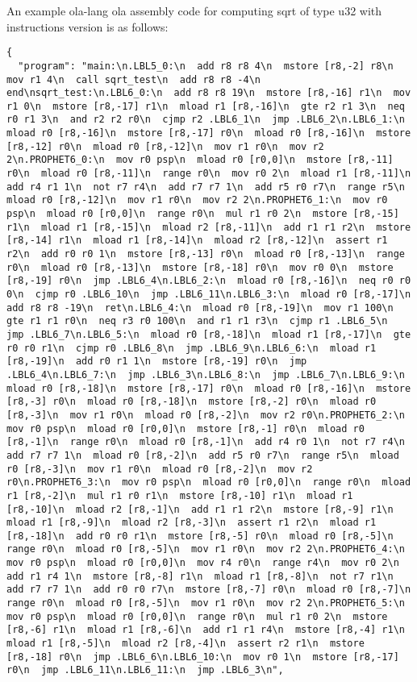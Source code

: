 An example ola-lang ola assembly code for computing sqrt of type u32 with instructions version is as follows:
\begin{lstlisting}[language={}]
{
  "program": "main:\n.LBL5_0:\n  add r8 r8 4\n  mstore [r8,-2] r8\n  mov r1 4\n  call sqrt_test\n  add r8 r8 -4\n  end\nsqrt_test:\n.LBL6_0:\n  add r8 r8 19\n  mstore [r8,-16] r1\n  mov r1 0\n  mstore [r8,-17] r1\n  mload r1 [r8,-16]\n  gte r2 r1 3\n  neq r0 r1 3\n  and r2 r2 r0\n  cjmp r2 .LBL6_1\n  jmp .LBL6_2\n.LBL6_1:\n  mload r0 [r8,-16]\n  mstore [r8,-17] r0\n  mload r0 [r8,-16]\n  mstore [r8,-12] r0\n  mload r0 [r8,-12]\n  mov r1 r0\n  mov r2 2\n.PROPHET6_0:\n  mov r0 psp\n  mload r0 [r0,0]\n  mstore [r8,-11] r0\n  mload r0 [r8,-11]\n  range r0\n  mov r0 2\n  mload r1 [r8,-11]\n  add r4 r1 1\n  not r7 r4\n  add r7 r7 1\n  add r5 r0 r7\n  range r5\n  mload r0 [r8,-12]\n  mov r1 r0\n  mov r2 2\n.PROPHET6_1:\n  mov r0 psp\n  mload r0 [r0,0]\n  range r0\n  mul r1 r0 2\n  mstore [r8,-15] r1\n  mload r1 [r8,-15]\n  mload r2 [r8,-11]\n  add r1 r1 r2\n  mstore [r8,-14] r1\n  mload r1 [r8,-14]\n  mload r2 [r8,-12]\n  assert r1 r2\n  add r0 r0 1\n  mstore [r8,-13] r0\n  mload r0 [r8,-13]\n  range r0\n  mload r0 [r8,-13]\n  mstore [r8,-18] r0\n  mov r0 0\n  mstore [r8,-19] r0\n  jmp .LBL6_4\n.LBL6_2:\n  mload r0 [r8,-16]\n  neq r0 r0 0\n  cjmp r0 .LBL6_10\n  jmp .LBL6_11\n.LBL6_3:\n  mload r0 [r8,-17]\n  add r8 r8 -19\n  ret\n.LBL6_4:\n  mload r0 [r8,-19]\n  mov r1 100\n  gte r1 r1 r0\n  neq r3 r0 100\n  and r1 r1 r3\n  cjmp r1 .LBL6_5\n  jmp .LBL6_7\n.LBL6_5:\n  mload r0 [r8,-18]\n  mload r1 [r8,-17]\n  gte r0 r0 r1\n  cjmp r0 .LBL6_8\n  jmp .LBL6_9\n.LBL6_6:\n  mload r1 [r8,-19]\n  add r0 r1 1\n  mstore [r8,-19] r0\n  jmp .LBL6_4\n.LBL6_7:\n  jmp .LBL6_3\n.LBL6_8:\n  jmp .LBL6_7\n.LBL6_9:\n  mload r0 [r8,-18]\n  mstore [r8,-17] r0\n  mload r0 [r8,-16]\n  mstore [r8,-3] r0\n  mload r0 [r8,-18]\n  mstore [r8,-2] r0\n  mload r0 [r8,-3]\n  mov r1 r0\n  mload r0 [r8,-2]\n  mov r2 r0\n.PROPHET6_2:\n  mov r0 psp\n  mload r0 [r0,0]\n  mstore [r8,-1] r0\n  mload r0 [r8,-1]\n  range r0\n  mload r0 [r8,-1]\n  add r4 r0 1\n  not r7 r4\n  add r7 r7 1\n  mload r0 [r8,-2]\n  add r5 r0 r7\n  range r5\n  mload r0 [r8,-3]\n  mov r1 r0\n  mload r0 [r8,-2]\n  mov r2 r0\n.PROPHET6_3:\n  mov r0 psp\n  mload r0 [r0,0]\n  range r0\n  mload r1 [r8,-2]\n  mul r1 r0 r1\n  mstore [r8,-10] r1\n  mload r1 [r8,-10]\n  mload r2 [r8,-1]\n  add r1 r1 r2\n  mstore [r8,-9] r1\n  mload r1 [r8,-9]\n  mload r2 [r8,-3]\n  assert r1 r2\n  mload r1 [r8,-18]\n  add r0 r0 r1\n  mstore [r8,-5] r0\n  mload r0 [r8,-5]\n  range r0\n  mload r0 [r8,-5]\n  mov r1 r0\n  mov r2 2\n.PROPHET6_4:\n  mov r0 psp\n  mload r0 [r0,0]\n  mov r4 r0\n  range r4\n  mov r0 2\n  add r1 r4 1\n  mstore [r8,-8] r1\n  mload r1 [r8,-8]\n  not r7 r1\n  add r7 r7 1\n  add r0 r0 r7\n  mstore [r8,-7] r0\n  mload r0 [r8,-7]\n  range r0\n  mload r0 [r8,-5]\n  mov r1 r0\n  mov r2 2\n.PROPHET6_5:\n  mov r0 psp\n  mload r0 [r0,0]\n  range r0\n  mul r1 r0 2\n  mstore [r8,-6] r1\n  mload r1 [r8,-6]\n  add r1 r1 r4\n  mstore [r8,-4] r1\n  mload r1 [r8,-5]\n  mload r2 [r8,-4]\n  assert r2 r1\n  mstore [r8,-18] r0\n  jmp .LBL6_6\n.LBL6_10:\n  mov r0 1\n  mstore [r8,-17] r0\n  jmp .LBL6_11\n.LBL6_11:\n  jmp .LBL6_3\n",

\end{lstlisting}
